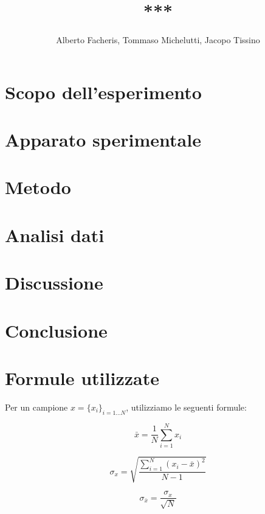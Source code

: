 \documentclass[12pt,a4paper]{article}
\title{***}
\author{Alberto Facheris, Tommaso Michelutti, Jacopo Tissino}
\begin{document}
\maketitle

\section{Scopo dell'esperimento} %

\section{Apparato sperimentale} %

\section{Metodo}

\section{Analisi dati}



\section{Discussione} %

\section{Conclusione} %

\appendix

\clearpage


\section{Formule utilizzate} %

Per un campione $x = \lbrace x_i \rbrace _{i = 1 \dots N}$, utilizziamo le seguenti formule:

\begin{equation}
\bar{x} = \frac{1}{N} \sum_{i=1}^N x_i
\end{equation}

\begin{equation}
\sigma_x = \sqrt{\frac{\displaystyle \sum_{i=1}^N (x_i - \bar{x})^2}{N-1}}
\end{equation}

\begin{equation}
\sigma_{\bar{x}} = \frac{\sigma_x}{\sqrt{N}}
\end{equation}
\end{document}
